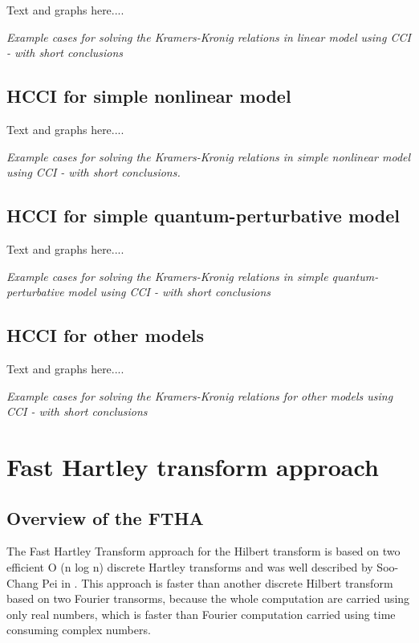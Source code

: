 \documentclass[12pt,twoside,a4paper]{article}
\numberwithin{equation}{subsection}
\numberwithin{figure}{subsection}
\begin{document}
Text and graphs here.... 

\textit{Example cases for solving the Kramers-Kronig relations in linear model using CCI - with short conclusions}

\subsection{HCCI for simple nonlinear model} \label{chap:hcc_nlo}

Text and graphs here.... 

\textit{Example cases for solving the Kramers-Kronig relations in simple nonlinear model using CCI - with short conclusions.}


\subsection{HCCI for simple quantum-perturbative model} \label{chap:hcc_quantum}
 
Text and graphs here.... 

\textit{Example cases for solving the Kramers-Kronig relations in simple quantum-perturbative model using CCI - with short
conclusions}

\subsection{HCCI for other models} \label{chap:hcc_other}

Text and graphs here.... 

\textit{Example cases for solving the Kramers-Kronig relations for other models using CCI - with short conclusions}

\section{Fast Hartley transform approach} \label{chap:hartley}

\subsection{Overview of the FTHA} \label{chap:hartley_overview}

The Fast Hartley Transform approach for the Hilbert transform is based on two efficient O (n log n) discrete Hartley transforms and
was well described by Soo-Chang Pei in \cite{chang_computation}. This approach is faster than another discrete Hilbert transform
based on two Fourier transorms, because the whole computation are carried using only real numbers, which is faster than Fourier computation carried
using time consuming complex numbers.
\end{document}
